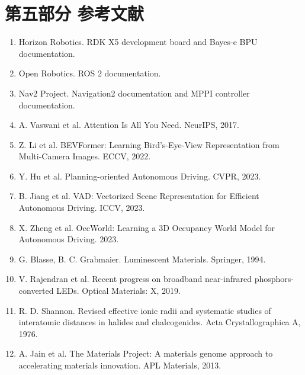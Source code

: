 \section{第五部分 参考文献}
\begin{enumerate}
  \item Horizon Robotics. RDK X5 development board and Bayes-e BPU documentation.
  \item Open Robotics. ROS 2 documentation.
  \item Nav2 Project. Navigation2 documentation and MPPI controller documentation.
  \item A. Vaswani et al. Attention Is All You Need. NeurIPS, 2017.
  \item Z. Li et al. BEVFormer: Learning Bird's-Eye-View Representation from Multi-Camera Images. ECCV, 2022.
  \item Y. Hu et al. Planning-oriented Autonomous Driving. CVPR, 2023.
  \item B. Jiang et al. VAD: Vectorized Scene Representation for Efficient Autonomous Driving. ICCV, 2023.
  \item X. Zheng et al. OccWorld: Learning a 3D Occupancy World Model for Autonomous Driving. 2023.
  \item G. Blasse, B. C. Grabmaier. Luminescent Materials. Springer, 1994.
  \item V. Rajendran et al. Recent progress on broadband near-infrared phosphors-converted LEDs. Optical Materials: X, 2019.
  \item R. D. Shannon. Revised effective ionic radii and systematic studies of interatomic distances in halides and chalcogenides. Acta Crystallographica A, 1976.
  \item A. Jain et al. The Materials Project: A materials genome approach to accelerating materials innovation. APL Materials, 2013.
\end{enumerate}
